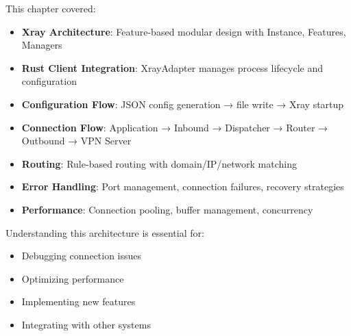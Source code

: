 This chapter covered:

\begin{itemize}
    \item \textbf{Xray Architecture}: Feature-based modular design with Instance, Features, Managers
    \item \textbf{Rust Client Integration}: XrayAdapter manages process lifecycle and configuration
    \item \textbf{Configuration Flow}: JSON config generation → file write → Xray startup
    \item \textbf{Connection Flow}: Application → Inbound → Dispatcher → Router → Outbound → VPN Server
    \item \textbf{Routing}: Rule-based routing with domain/IP/network matching
    \item \textbf{Error Handling}: Port management, connection failures, recovery strategies
    \item \textbf{Performance}: Connection pooling, buffer management, concurrency
\end{itemize}

Understanding this architecture is essential for:
\begin{itemize}
    \item Debugging connection issues
    \item Optimizing performance
    \item Implementing new features
    \item Integrating with other systems
\end{itemize}

